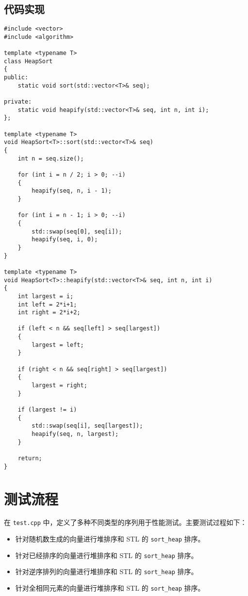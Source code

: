 \documentclass[UTF8]{ctexart}
\begin{document}
\subsection{代码实现}
\begin{lstlisting}[style=customcpp]
#include <vector>
#include <algorithm> 

template <typename T>
class HeapSort 
{
public:
    static void sort(std::vector<T>& seq);

private:
    static void heapify(std::vector<T>& seq, int n, int i);
};

template <typename T>
void HeapSort<T>::sort(std::vector<T>& seq) 
{
    int n = seq.size();

    for (int i = n / 2; i > 0; --i) 
    {
        heapify(seq, n, i - 1);
    }
    
    for (int i = n - 1; i > 0; --i) 
    {
        std::swap(seq[0], seq[i]); 
        heapify(seq, i, 0);
    }
}

template <typename T>
void HeapSort<T>::heapify(std::vector<T>& seq, int n, int i) 
{
    int largest = i; 
    int left = 2*i+1; 
    int right = 2*i+2; 

    if (left < n && seq[left] > seq[largest]) 
    {
        largest = left;
    }

    if (right < n && seq[right] > seq[largest]) 
    {
        largest = right;
    }

    if (largest != i) 
    {
        std::swap(seq[i], seq[largest]);
        heapify(seq, n, largest); 
    }

    return;
}
\end{lstlisting}

\section{测试流程}
在 \texttt{test.cpp} 中，定义了多种不同类型的序列用于性能测试。主要测试过程如下：

\begin{itemize}
    \item 针对随机数生成的向量进行堆排序和 STL 的 \texttt{sort\_heap} 排序。
    \item 针对已经排序的向量进行堆排序和 STL 的 \texttt{sort\_heap} 排序。
    \item 针对逆序排列的向量进行堆排序和 STL 的 \texttt{sort\_heap} 排序。
    \item 针对全相同元素的向量进行堆排序和 STL 的 \texttt{sort\_heap} 排序。
\end{itemize}
\end{document}
